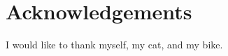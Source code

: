 \documentclass[../main.tex]{subfiles}
\begin{document}
\chapter{Acknowledgements}

I would like to thank myself, my cat, and my bike.

\newpage
\end{document}
